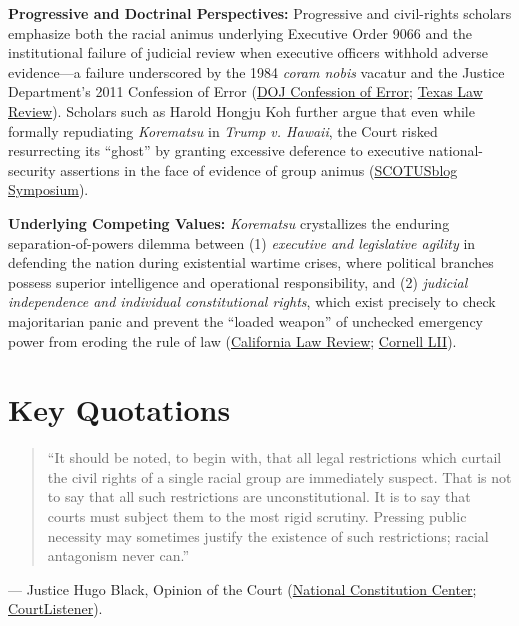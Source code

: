 \documentclass[12pt]{article}
\begin{document}
\textbf{Progressive and Doctrinal Perspectives:} Progressive and civil-rights scholars emphasize both the racial animus underlying Executive Order 9066 and the institutional failure of judicial review when executive officers withhold adverse evidence---a failure underscored by the 1984 \textit{coram nobis} vacatur and the Justice Department's 2011 Confession of Error (\href{https://www.justice.gov/archives/opa/blog/confession-error-solicitor-generals-mistakes-during-japanese-american-internment-cases}{DOJ Confession of Error}; \href{https://texaslawreview.org/korematsu-hirabayashi-and-the-second-monster/}{Texas Law Review}). Scholars such as Harold Hongju Koh further argue that even while formally repudiating \textit{Korematsu} in \textit{Trump v. Hawaii}, the Court risked resurrecting its ``ghost'' by granting excessive deference to executive national-security assertions in the face of evidence of group animus (\href{https://www.scotusblog.com/2018/06/symposium-trump-v-hawaii-korematsus-ghost-and-national-security-masquerades/}{SCOTUSblog Symposium}).

\textbf{Underlying Competing Values:} \textit{Korematsu} crystallizes the enduring separation-of-powers dilemma between (1) \textit{executive and legislative agility} in defending the nation during existential wartime crises, where political branches possess superior intelligence and operational responsibility, and (2) \textit{judicial independence and individual constitutional rights}, which exist precisely to check majoritarian panic and prevent the ``loaded weapon'' of unchecked emergency power from eroding the rule of law (\href{https://www.californialawreview.org/print/constructive-constitutional-history-and-habeas-corpus-today}{California Law Review}; \href{https://www.law.cornell.edu/supremecourt/text/323/214}{Cornell LII}).

\section{Key Quotations}
\begin{quote}
``It should be noted, to begin with, that all legal restrictions which curtail the civil rights of a single racial group are immediately suspect. That is not to say that all such restrictions are unconstitutional. It is to say that courts must subject them to the most rigid scrutiny. Pressing public necessity may sometimes justify the existence of such restrictions; racial antagonism never can.''
\end{quote}
\noindent --- Justice Hugo Black, Opinion of the Court (\href{https://constitutioncenter.org/blog/on-this-day-the-supreme-court-issues-the-korematsu-decision}{National Constitution Center}; \href{https://www.courtlistener.com/opinion/104040/korematsu-v-united-states/}{CourtListener}).
\end{document}
